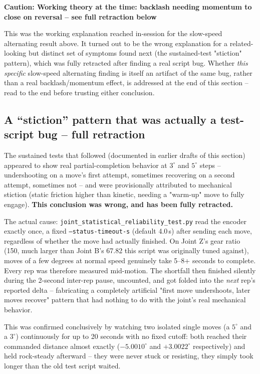 \documentclass[11pt,letterpaper]{article}
\newenvironment{caution}[1]{%
    \par\addvspace{8pt}%
    \noindent{\color{cautionred}\rule{\linewidth}{0.8pt}}\par\vspace{2pt}
    \noindent\textbf{\color{cautionred}Caution: #1}\par\vspace{2pt}
}{%
    \par\vspace{2pt}\noindent{\color{cautionred}\rule{\linewidth}{0.4pt}}%
    \par\addvspace{8pt}%
}
\begin{document}
\begin{caution}{Working theory at the time: backlash needing momentum to close on reversal -- see full retraction below}
This was the working explanation reached in-session for the slow-speed alternating result above. It turned out to be the wrong explanation for a related-looking but distinct set of symptoms found next (the sustained-test "stiction" pattern), which was fully retracted after finding a real script bug. Whether \emph{this specific} slow-speed alternating finding is itself an artifact of the same bug, rather than a real backlash/momentum effect, is addressed at the end of this section -- read to the end before trusting either conclusion.
\end{caution}

\subsection{A ``stiction'' pattern that was actually a test-script bug -- full retraction}
The sustained tests that followed (documented in earlier drafts of this section) appeared to show real partial-completion behavior at $3^\circ$ and $5^\circ$ steps -- undershooting on a move's first attempt, sometimes recovering on a second attempt, sometimes not -- and were provisionally attributed to mechanical stiction (static friction higher than kinetic, needing a "warm-up" move to fully engage). \textbf{This conclusion was wrong, and has been fully retracted.}

The actual cause: \texttt{joint\_statistical\_reliability\_test.py} read the encoder exactly once, a fixed \texttt{--status-timeout-s} (default 4.0\,s) after sending each move, regardless of whether the move had actually finished. On Joint Z's gear ratio (150, much larger than Joint B's 67.82 this script was originally tuned against), moves of a few degrees at normal speed genuinely take 5--8+ seconds to complete. Every rep was therefore measured mid-motion. The shortfall then finished silently during the 2-second inter-rep pause, uncounted, and got folded into the \emph{next} rep's reported delta -- fabricating a completely artificial "first move undershoots, later moves recover" pattern that had nothing to do with the joint's real mechanical behavior.

This was confirmed conclusively by watching two isolated single moves (a $5^\circ$ and a $3^\circ$) continuously for up to 20 seconds with no fixed cutoff: both reached their commanded distance almost exactly ($-5.0010^\circ$ and $+3.0022^\circ$ respectively) and held rock-steady afterward -- they were never stuck or resisting, they simply took longer than the old test script waited.
\end{document}
